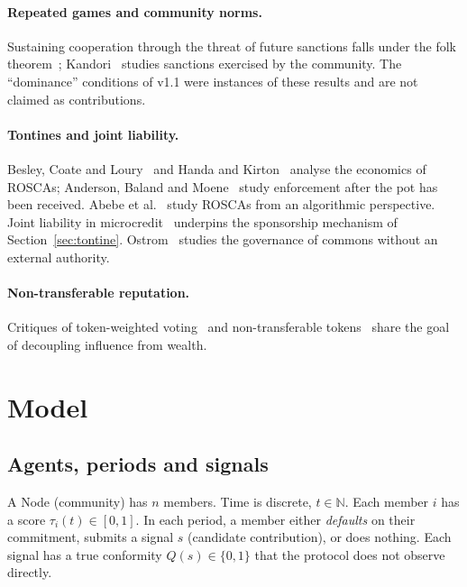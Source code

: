 \documentclass[11pt,a4paper]{article}
\theoremstyle{plain}
\theoremstyle{definition}
\theoremstyle{remark}
\newcommand{\1}{\mathbf{1}}
\begin{document}
\paragraph{Repeated games and community norms.} Sustaining cooperation through
the threat of future sanctions falls under the folk theorem~\cite{fudenberg1986};
Kandori~\cite{kandori1992} studies sanctions exercised by the community. The
``dominance'' conditions of v1.1 were instances of these results and are not
claimed as contributions.

\paragraph{Tontines and joint liability.} Besley, Coate and
Loury~\cite{besley1993} and Handa and Kirton~\cite{handa1999} analyse the
economics of ROSCAs; Anderson, Baland and Moene~\cite{anderson2009} study
enforcement after the pot has been received. Abebe et al.~\cite{abebe2022}
study ROSCAs from an algorithmic perspective. Joint liability in
microcredit~\cite{besley1995,ghatak1999} underpins the sponsorship mechanism of
Section~\ref{sec:tontine}. Ostrom~\cite{ostrom1990} studies the governance of
commons without an external authority.

\paragraph{Non-transferable reputation.} Critiques of token-weighted
voting~\cite{buterin2021} and non-transferable tokens~\cite{weyl2022} share the
goal of decoupling influence from wealth.

\section{Model}
\label{sec:model}

\subsection{Agents, periods and signals}

A Node (community) has $n$ members. Time is discrete, $t\in\mathbb{N}$. Each
member $i$ has a score $\tau_i(t)\in[0,1]$. In each period, a member either
\emph{defaults} on their commitment, submits a signal $s$ (candidate
contribution), or does nothing. Each signal has a true conformity
$Q(s)\in\{0,1\}$ that the protocol does not observe directly.
\end{document}
